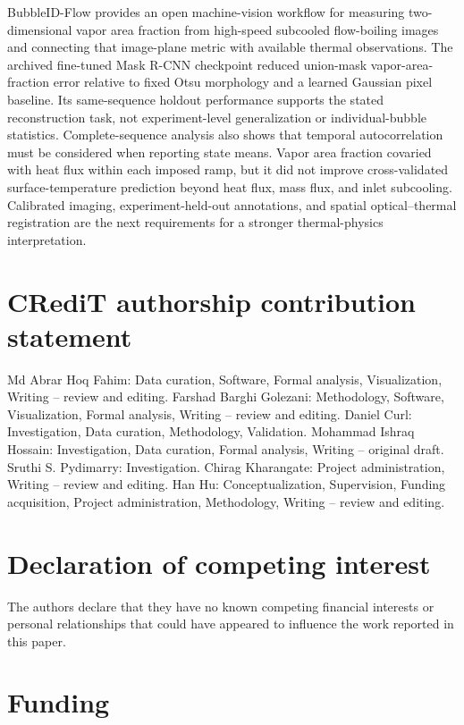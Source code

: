 \documentclass[preprint,12pt,sort&compress]{elsarticle}
\begin{document}
\begin{sloppypar}
BubbleID-Flow provides an open machine-vision workflow for measuring two-dimensional vapor area fraction from high-speed subcooled flow-boiling images and connecting that image-plane metric with available thermal observations. The archived fine-tuned Mask R-CNN checkpoint reduced union-mask vapor-area-fraction error relative to fixed Otsu morphology and a learned Gaussian pixel baseline. Its same-sequence holdout performance supports the stated reconstruction task, not experiment-level generalization or individual-bubble statistics. Complete-sequence analysis also shows that temporal autocorrelation must be considered when reporting state means. Vapor area fraction covaried with heat flux within each imposed ramp, but it did not improve cross-validated surface-temperature prediction beyond heat flux, mass flux, and inlet subcooling. Calibrated imaging, experiment-held-out annotations, and spatial optical--thermal registration are the next requirements for a stronger thermal-physics interpretation.
\end{sloppypar}

\section*{CRediT authorship contribution statement}

Md Abrar Hoq Fahim: Data curation, Software, Formal analysis, Visualization, Writing -- review and editing. Farshad Barghi Golezani: Methodology, Software, Visualization, Formal analysis, Writing -- review and editing. Daniel Curl: Investigation, Data curation, Methodology, Validation. Mohammad Ishraq Hossain: Investigation, Data curation, Formal analysis, Writing -- original draft. Sruthi S. Pydimarry: Investigation. Chirag Kharangate: Project administration, Writing -- review and editing. Han Hu: Conceptualization, Supervision, Funding acquisition, Project administration, Methodology, Writing -- review and editing.

\section*{Declaration of competing interest}

The authors declare that they have no known competing financial interests or personal relationships that could have appeared to influence the work reported in this paper.

\section*{Funding}
\end{document}
